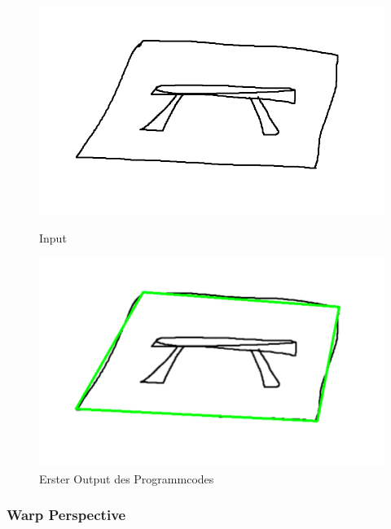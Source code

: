 \begin{figure}[htb]
    \centering
    \begin{minipage}[t]{0.45\linewidth}
        \centering
        \includegraphics[width=\linewidth]{pics/bildverarbeitungsalgos/ApproxPolyDP_input.png}
        \caption{Input}
        \label{maai:approxpolydp:input}
    \end{minipage}
    \hfill
    \begin{minipage}[t]{0.45\linewidth}
        \centering
        \includegraphics[width=\linewidth]{pics/bildverarbeitungsalgos/ApproxPolyDP_output.png}
        \caption{Erster Output des Programmcodes}
        \label{maai:approxpolydp:output}
    \end{minipage}
\end{figure}


\subsubsection{Warp Perspective}\label{maai:wrapPerspective}

